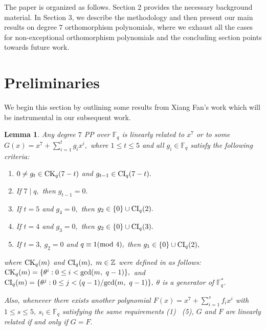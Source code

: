 \documentclass[12pt,a4wide, reqno]{amsart}
\newtheorem{lemma}{Lemma}
\theoremstyle{definition}
\theoremstyle{remark}
\numberwithin{equation}{section}
\begin{document}
The paper is organized as follows. Section 2 provides the necessary background material. In Section 3, we describe the methodology and then present our main results on degree $7$ orthomorphism polynomials, where we exhaust all the cases for non-exceptional orthomorphism polynomials and the concluding section points towards future work. 
\section{Preliminaries}
We begin this section by outlining some results from Xiang Fan's work \cite{xfan} which will be instrumental in our subsequent work.
\begin{lemma}\cite[Proposition~11]{xfan}\label{l3}
    Any degree $7$ PP over $\mathbb{F}_q$ is linearly related to $x^7$ or to some $G(x)=x^7+\sum_{i=1}^{t}g_ix^i,$ where $1\leq t \leq 5$ and all $g_i\in \mathbb{F}_q$ satisfy the following criteria:
    \begin{enumerate}[label=\textup{(\arabic*)}]
        \item 
        $0\neq g_t\in \textup{CK}_q(7-t)$ and $g_{t-1}\in \textup{CI}_q(7-t).$
        \item 
        If $7\mid q,$ then $g_{t-1}=0.$
        \item 
        If $t=5$ and $g_4=0,$ then $g_2\in \{0\}\cup \textup{CI}_q(2).$ 
        \item 
        If $t=4$ and $g_3=0,$ then $g_2\in \{0\}\cup \textup{CI}_q(3).$
        \item 
        If $t=3,~g_2=0$ and $q\equiv 1 (\textup{mod}~4),$ then $g_1\in \{0\}\cup \textup{CI}_q(2),$
    \end{enumerate}
    where $\textup{CK}_q(m)$ and $\textup{CI}_q(m),~m\in\mathbb{Z}$ were defined in \cite{xfan} as follows:\\
    \hspace*{3 cm} $\textup{CK}_q(m)=\{\theta^i: 0\leq i < \textup{gcd}(m,~q-1)\},$~and\\
 \hspace*{3 cm} $\textup{CI}_q(m)=\{\theta^j: 0\leq j < (q-1)/\textup{gcd}(m,~q-1)\},$ $\theta$ is a generator of $\mathbb{F}_q^*.$

Also, whenever there exists another polynomial $F(x)=x^7+\sum_{i=1}^{s}f_i x^i$ with $1\leq s \leq 5,~s_i\in \mathbb{F}_q$ satisfying the same requirements \emph{(1) \textendash\ (5)}, $G$ and $F$ are linearly related if and only if $G=F.$
\end{lemma}
\end{document}
